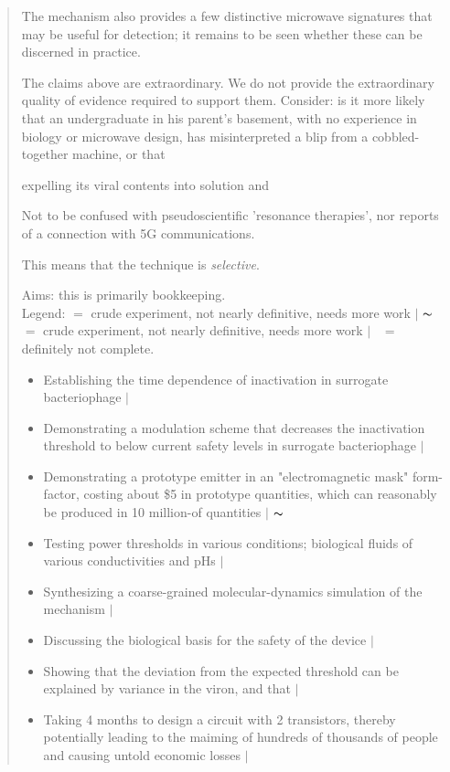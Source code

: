 \documentclass[paper.tex]{subfiles}
\begin{document}
\begin{quotation}
The mechanism also provides a few distinctive microwave signatures that may be useful for detection; it remains to be seen whether these can be discerned in practice.

The claims above are extraordinary. We do not provide the extraordinary quality of evidence required to support them. Consider: is it more likely that an undergraduate in his parent's basement, with no experience in biology or microwave design, has misinterpreted a blip from a cobbled-together machine, or that 

expelling its viral contents into solution and 

Not to be confused with pseudoscientific 'resonance therapies', nor reports of a connection with 5G communications.

This means that the technique is {\it selective}.






Aims: this is primarily bookkeeping.\\

Legend:  \cmark $ = $ crude experiment, not nearly definitive, needs more work $\vert$ $\thicksim$ $ = $ crude experiment, not nearly definitive, needs more work $\vert$ \xmark \ $ = $ definitely not complete.\\

\begin{itemize}
  \item Establishing the time dependence of inactivation in surrogate bacteriophage $\vert$ \cmark
  \item Demonstrating a modulation scheme that decreases the inactivation threshold to below current safety levels in surrogate bacteriophage $\vert$ \cmark
  \item Demonstrating a prototype emitter in an "electromagnetic mask" form-factor, costing about \$5 in prototype quantities, which can reasonably be produced in 10 million-of quantities $\vert$ $\thicksim$
  \item Testing power thresholds in various conditions; biological fluids of various conductivities and pHs $\vert$ \xmark
  \item Synthesizing a coarse-grained molecular-dynamics simulation of the mechanism $\vert$ \xmark
  \item Discussing the biological basis for the safety of the device $\vert$ \cmark
  \item Showing that the deviation from the expected threshold can be explained by variance in the viron, and that  $\vert$ \cmark
  \item Taking 4 months to design a circuit with 2 transistors, thereby potentially leading to the maiming of hundreds of thousands of people and causing untold economic losses $\vert$ \cmark
  

\end{itemize}
\end{quotation}
\end{document}
